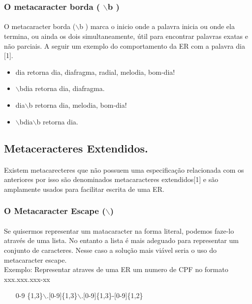 \documentclass[10pt,a4paper]{article}
\newcommand{\CBarra}{$\backslash$}
\begin{document}
\subsubsection{O metacaracter borda ( \CBarra b )}
\paragraph*{}
O metacaracter borda (\CBarra b ) marca o inicio onde a palavra inicia ou onde ela termina, ou ainda os dois simultaneamente, útil para encontrar palavras exatas e não parciais. A seguir um exemplo do comportamento da ER com a palavra dia [1].
\begin{itemize}
\item dia retorna dia, diafragma, radial, melodia, bom-dia!
\item \CBarra bdia retorna dia, diafragma.
\item dia\CBarra b retorna dia, melodia, bom-dia!
\item \CBarra bdia\CBarra b retorna dia.
\end{itemize}
\subsection{Metaceracteres Extendidos.}
\paragraph*{}
Existem metacarecteres que não possuem uma especificação relacionada com os anteriores por isso são denominados metacaracteres extendidos[1] e são amplamente usados para facilitar escrita de uma ER.
\subsubsection{O Metacaracter Escape (\CBarra )}
\paragraph*{}
Se quisermos representar um matacaracter na forma literal, podemos faze-lo através de uma lista. No entanto a lista é mais adeguado para representar um conjunto de caracteres. Nesse caso a solução mais viável seria o uso do metacaracter escape.\\
Exemplo: Representar atraves de uma ER um numero de CPF no formato xxx.xxx.xxx-xx
\begin{itemize}
\item
[0-9]\{1,3\}\CBarra.[0-9]\{1,3\}\CBarra.[0-9]\{1,3\}-[0-9]\{1,2\}
\end{itemize}
\end{document}
